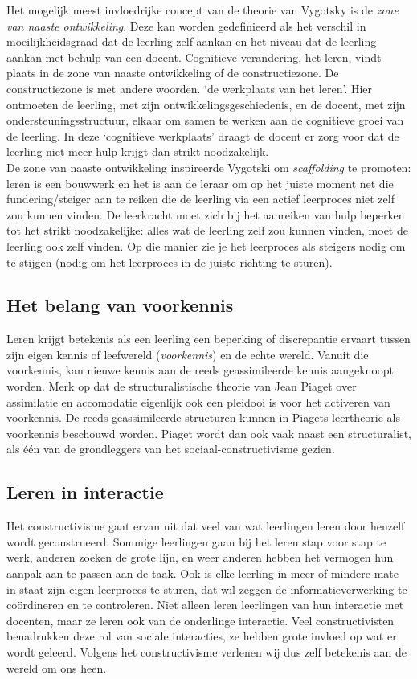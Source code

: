 \documentclass[a4paper,11pt]{article}
\begin{document}
\noindent Het mogelijk meest invloedrijke concept
van de theorie van Vygotsky is de \textit{zone van naaste ontwikkeling}. Deze kan worden gedefinieerd
als het verschil in moeilijkheidsgraad dat de leerling zelf aankan en het niveau dat de leerling
aankan met behulp van een docent. Cognitieve verandering, het leren, vindt plaats in de zone
van naaste ontwikkeling of de constructiezone. De constructiezone is met andere woorden. ‘de werkplaats
van het leren’. Hier ontmoeten de leerling, met zijn ontwikkelingsgeschiedenis, en de docent,
met zijn ondersteuningsstructuur, elkaar om samen te werken aan de cognitieve groei van de
leerling. In deze ‘cognitieve werkplaats’ draagt de docent er zorg voor dat de leerling niet
meer hulp krijgt dan strikt noodzakelijk.\\

\noindent De zone van naaste ontwikkeling inspireerde Vygotski om
\textit{scaffolding} te promoten: leren is een bouwwerk en het is aan de leraar 
om op het juiste moment net die fundering/steiger aan te reiken die de leerling via een 
actief leerproces niet zelf zou kunnen vinden. De leerkracht moet zich bij het 
aanreiken van hulp beperken tot het strikt noodzakelijke: alles wat de leerling 
zelf zou kunnen vinden, moet de leerling ook zelf vinden. Op die manier zie je 
het leerproces als steigers nodig om te stijgen (nodig om het leerproces in de juiste richting te 
sturen).
\subsection{Het belang van voorkennis}
Leren krijgt betekenis als een leerling een beperking of discrepantie ervaart tussen zijn eigen kennis of leefwereld (\textit{voorkennis})
en de echte wereld. Vanuit die voorkennis, kan nieuwe kennis aan de reeds 
geassimileerde kennis aangeknoopt worden.
Merk op dat de structuralistische theorie van Jean Piaget over assimilatie en accomodatie 
eigenlijk ook een pleidooi is voor het activeren van voorkennis. De reeds 
geassimileerde structuren kunnen in Piagets leertheorie als voorkennis beschouwd worden. Piaget 
wordt dan ook vaak naast een structuralist, als één van de grondleggers van het 
sociaal-constructivisme gezien.

\subsection{Leren in interactie}
Het constructivisme gaat ervan uit dat veel van wat leerlingen leren door henzelf wordt geconstrueerd.
Sommige leerlingen gaan bij het leren stap voor stap te werk, anderen zoeken de
grote lijn, en weer anderen hebben het vermogen hun aanpak aan te passen aan de taak. Ook
is elke leerling in meer of mindere mate in staat zijn eigen leerproces te sturen, dat wil zeggen
de informatieverwerking te coördineren en te controleren. Niet alleen leren leerlingen van hun
interactie met docenten, maar ze leren ook van de onderlinge interactie. Veel constructivisten
benadrukken deze rol van sociale interacties, ze hebben grote invloed op wat er wordt geleerd.
Volgens het constructivisme verlenen wij dus zelf betekenis aan de wereld om ons heen.
\end{document}
